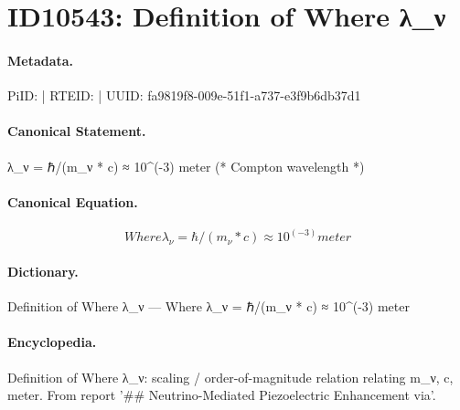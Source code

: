 \section*{ID10543: Definition of Where λ\_ν}
\paragraph{Metadata.}
PiID:  | RTEID:  | UUID: fa9819f8-009e-51f1-a737-e3f9b6db37d1

\paragraph{Canonical Statement.}
λ\_ν = ℏ/(m\_ν * c) ≈ 10\textasciicircum{}(-3) meter (* Compton wavelength *)

\paragraph{Canonical Equation.}
\[
Where λ_ν = ℏ/(m_ν * c) ≈ 10^(-3) meter
\]

\paragraph{Dictionary.}
Definition of Where λ\_ν — Where λ\_ν = ℏ/(m\_ν * c) ≈ 10\textasciicircum{}(-3) meter

\paragraph{Encyclopedia.}
Definition of Where λ\_ν: scaling / order-of-magnitude relation relating m\_ν, c, meter. From report '\#\# Neutrino-Mediated Piezoelectric Enhancement via'.
